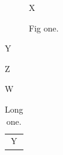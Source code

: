 \documentclass{amsart}
\begin{document}
\begin{figure}[h]X\caption{Fig one.}\end{figure}
\begin{table}[h]\caption{Tab one.}Y\end{table}
\begin{listing}[h]Z\caption{Code one.}\end{listing}
\begin{program}[h]W\caption{Prog one.}\end{program}
\begin{longtable}{c}\caption{Long one.}\\ Y\\ \end{longtable}
\end{document}
